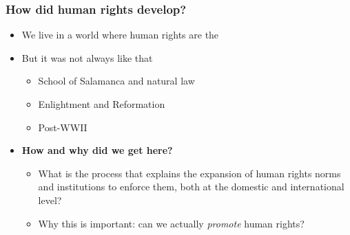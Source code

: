 \documentclass[aspectratio=43]{beamer}
\begin{document}
\begin{frame}
\frametitle{How did human rights develop?}
\centering

\begin{itemize}
  \item We live in a world where human rights are the 
  \item<2-> But it was not always like that
  \begin{itemize}
    \item<3-> School of Salamanca and natural law
    \item<4-> Enlightment and Reformation
    \item<5-> Post-WWII
  \end{itemize}
  \item<6-> \textbf{How and why did we get here?}
  \begin{itemize}
    \item What is the process that explains the expansion of human rights norms and institutions to enforce them, both at the domestic and international level?
    \item<6-> Why this is important: can we actually \textit{promote} human rights?
  \end{itemize}
\end{itemize}


\end{frame}
\end{document}
